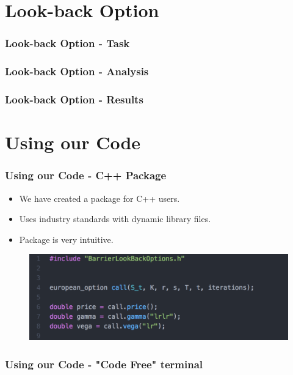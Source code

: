 \documentclass[12pt]{beamer}
\begin{document}
\section{Look-back Option}
\begin{frame}
\frametitle{Look-back Option - Task}

\end{frame}

\begin{frame}
\frametitle{Look-back Option - Analysis}
\end{frame}

\begin{frame}
\frametitle{Look-back Option - Results}

\end{frame}


\section{Using our Code}
\begin{frame}
\frametitle{Using our Code - C++ Package}
\begin{itemize}
  \item We have created a package for C++ users.
  \item Uses industry standards with dynamic library files.
  \item Package is very intuitive.
\end{itemize}

\begin{figure}[h!]
  \centering
\includegraphics[width=\textwidth]{graphs/code_easy_demo.png}
\end{figure}
\end{frame}


\begin{frame}
\frametitle{Using our Code - "Code Free" terminal}

\end{frame}
\end{document}
